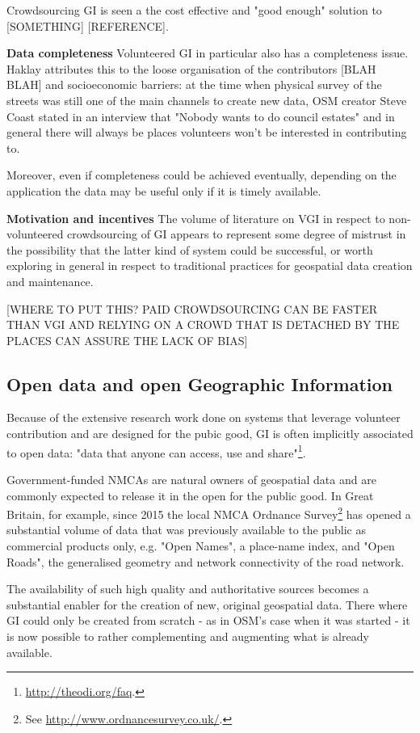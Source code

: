 Crowdsourcing GI is seen a the cost effective and "good enough" solution to [SOMETHING] [REFERENCE]. 

\textbf{Data completeness} Volunteered GI in particular also has a completeness issue. Haklay attributes this to the loose organisation of the contributors \cite{Haklay:2010vs} [BLAH BLAH] and socioeconomic barriers: at the time when physical survey of the streets was still one of the main channels to create new data, OSM creator Steve Coast stated in an interview that "Nobody wants to do council estates" \cite{Anonymous:2007ux} and in general there will always be places volunteers won't be interested in contributing to.

Moreover, even if completeness could be achieved eventually, depending on the application the data may be useful only if it is timely available.

\textbf{Motivation and incentives} The volume of literature on VGI in respect to non-volunteered crowdsourcing of GI appears to represent some degree of mistrust in the possibility that the latter kind of system could be successful, or worth exploring in general in respect to traditional practices for geospatial data creation and maintenance.   

[WHERE TO PUT THIS? PAID CROWDSOURCING CAN BE FASTER THAN VGI AND RELYING ON A CROWD THAT IS DETACHED BY THE PLACES CAN ASSURE THE LACK OF BIAS]

\subsection{Open data and open Geographic Information}

Because of the extensive research work done on systems that leverage volunteer contribution and are designed for the pubic good, GI is often implicitly associated to open data: "data that anyone can access, use and share"\footnote{\url{http://theodi.org/faq}.}. 

Government-funded NMCAs are natural owners of geospatial data and are commonly expected to release it in the open for the public good. In Great Britain, for example, since 2015 the local NMCA Ordnance Survey\footnote{See \url{http://www.ordnancesurvey.co.uk/}.} has opened a substantial volume of data that was previously available to the public as commercial products only, e.g. "Open Names", a place-name index, and "Open Roads", the generalised geometry and network connectivity of the road network.
	
The availability of such high quality and authoritative sources becomes a substantial enabler for the creation of new, original geospatial data. There where GI could only be created from scratch - as in OSM's case when it was started - it is now possible to rather complementing and augmenting what is already available.

